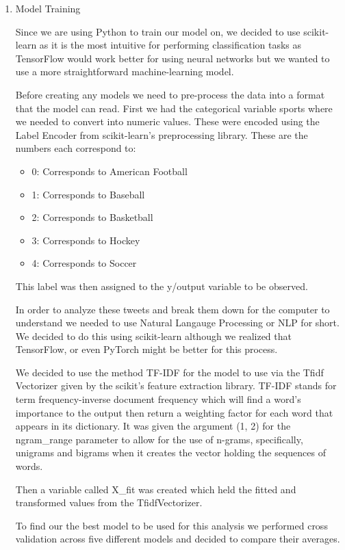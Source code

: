 \documentclass{article}
\begin{document}
\begin{enumerate}
\begin{itemize}
    \end{itemize}
    
    \item Model Training

    Since we are using Python to train our model on, we decided to use scikit-learn as it is the most intuitive for performing classification tasks as TensorFlow would work better for using neural networks but we wanted to use a more straightforward machine-learning model.
    
    Before creating any models we need to pre-process the data into a format that the model can read. First we had the categorical variable sports where we needed to convert into numeric values. These were encoded using the Label Encoder from scikit-learn's preprocessing library. 
    These are the numbers each correspond to:
    \begin{itemize}
    \item 0: Corresponds to American Football
    \item 1: Corresponds to Baseball
    \item 2: Corresponds to Basketball
    \item 3: Corresponds to Hockey
    \item 4: Corresponds to Soccer
    \end{itemize}

    This label was then assigned to the y/output variable to be observed. 

    In order to analyze these tweets and break them down for the computer to understand we needed to use Natural Langauge Processing or NLP for short.
    We decided to do this using scikit-learn although we realized that TensorFlow, or even PyTorch might be better for this process.

    We decided to use the method TF-IDF for the model to use via the Tfidf Vectorizer given by the scikit's feature extraction library. TF-IDF stands for term frequency-inverse document frequency which will find a word's importance to the output then return a weighting factor for each word that appears in its dictionary.
    It was given the argument (1, 2) for the ngram\_range parameter to allow for the use of n-grams, specifically, unigrams and bigrams when it creates the vector holding the sequences of words.

    Then a variable called X\_fit was created which held the fitted and transformed values from the TfidfVectorizer.

    To find our the best model to be used for this analysis we performed cross validation across five different models and decided to compare their averages. 



\end{enumerate}
\end{document}
